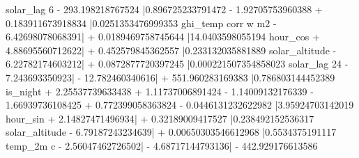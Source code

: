 solar_{lag 6} - 293.198218767524 \left|{0.896725233791472  - 1.92705753960388  + 0.183911673918834 \left|{0.0251353476999353 ghi_{temp corr w m2} - 6.42698078068391}\right| + 0.0189469758745644 \left|{14.0403598055194 hour_{cos} + 4.88695560712622}\right| + 0.452579845362557 \left|{0.233132035881889 solar_{altitude} - 6.22782174603212}\right| + 0.0872877720397245 \left|{0.000221507354858023 solar_{lag 24} - 7.243693350923}\right| - 12.782460340616}\right| + 551.960283169383 \left|{0.786803144452389 is_{night} + 2.25537739633438  + 1.11737006891424  - 1.14009132176339  - 1.66939736108425  + 0.772399058363824  - 0.0446131232622982 \left|{3.95924703142019 hour_{sin} + 2.14827471496934}\right| + 0.32189009417527 \left|{0.238492152536317 solar_{altitude} - 6.79187243234639}\right| + 0.00650303546612968 \left|{0.5534375191117 temp_{2m c} - 2.56047462726502}\right| - 4.68717144793136}\right| - 442.929176613586